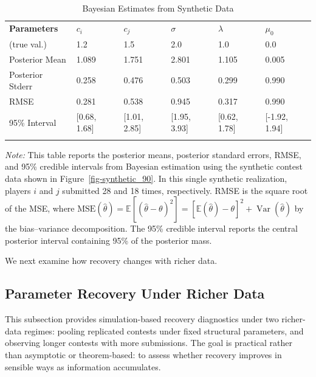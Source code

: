 \documentclass[mnsc]{informs3}
\begin{document}
\begin{table}[htbp]
\centering
\caption{Bayesian Estimates from Synthetic Data}\label{tbl-contest90}
\begin{tabularx}{\textwidth}{lYYYYY}
\toprule
\textbf{Parameters} & \textbf{$c_i$} & \textbf{$c_j$} & \textbf{$\sigma$} & \textbf{$\lambda$} & \textbf{$\mu_0$} \\
\addlinespace[0.25ex]
\addlinespace[0.25ex]
(true val.)        & 1.2 & 1.5 & 2.0 & 1.0 & 0.0 \\
\midrule
 Posterior Mean    & 1.089 & 1.751 & 2.801 & 1.105 & 0.005 \\
 Posterior Stderr   & 0.258 & 0.476 & 0.503 & 0.299 & 0.990 \\
 RMSE                  & 0.281 & 0.538 & 0.945 & 0.317 & 0.990 \\
 95\% Interval
		& [0.68, 1.68]
		& [1.01, 2.85]
		& [1.95, 3.93]
		& [0.62, 1.78]
		& [-1.92, 1.94] \\
\bottomrule
\addlinespace[0.5ex]
\end{tabularx}
\begin{minipage}{\textwidth}
{\footnotesize
\textit{Note:}
This table reports the posterior means, posterior standard errors, RMSE, and 95\% credible intervals from Bayesian estimation using the synthetic contest data shown in Figure~\ref{fig-synthetic_90}. In this single synthetic realization, players $i$ and $j$ submitted 28 and 18 times, respectively. RMSE is the square root of the MSE, where $\text{MSE}(\hat\theta) = \mathbb{E}[(\hat{\theta}-\theta)^2] = [\mathbb{E}(\hat{\theta}) - \theta]^2 + \operatorname{Var}(\hat{\theta})$ by the bias–variance decomposition.
The 95\% credible interval reports the central posterior interval containing 95\% of the posterior mass.
}
\end{minipage}
\end{table}


We next examine how recovery changes with richer data.


\subsection{Parameter Recovery Under Richer Data}

This subsection provides simulation-based recovery diagnostics under two richer-data regimes: pooling replicated contests under fixed structural parameters, and observing longer contests with more submissions.
The goal is practical rather than asymptotic or theorem-based: to assess whether recovery improves in sensible ways as information accumulates.
\end{document}
